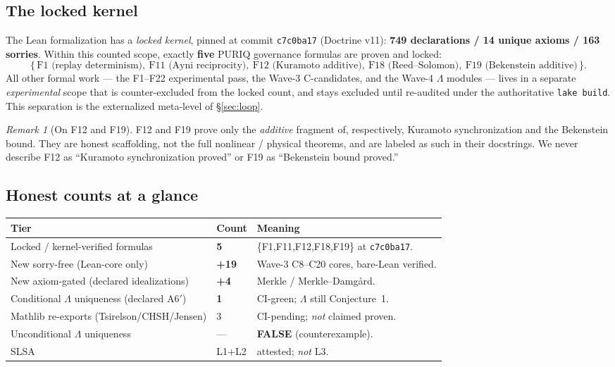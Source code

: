 \documentclass[11pt]{article}
\theoremstyle{plain}
\theoremstyle{definition}
\theoremstyle{remark}
\newtheorem{remark}[theorem]{Remark}
\newcommand{\La}{\Lambda}
\begin{document}
\subsection{The locked kernel}
\label{sec:locked}
The Lean formalization has a \emph{locked kernel}, pinned at commit
\texttt{c7c0ba17} (Doctrine v11): \textbf{749 declarations / 14 unique axioms / 163
sorries}. Within this counted scope, exactly \textbf{five} PURIQ governance
formulas are proven and locked:
\[
  \{\,\text{F1 (replay determinism)},\ \text{F11 (Ayni reciprocity)},\
    \text{F12 (Kuramoto additive)},\ \text{F18 (Reed--Solomon)},\
    \text{F19 (Bekenstein additive)}\,\}.
\]
All other formal work --- the F1--F22 experimental pass, the Wave-3 C-candidates,
and the Wave-4 $\La$ modules --- lives in a separate \emph{experimental} scope that
is counter-excluded from the locked count, and stays excluded until re-audited under
the authoritative \texttt{lake build}. This separation is the externalized
meta-level of \S\ref{sec:loop}.

\begin{remark}[On F12 and F19]
F12 and F19 prove only the \emph{additive} fragment of, respectively, Kuramoto
synchronization and the Bekenstein bound. They are honest scaffolding, not the full
nonlinear / physical theorems, and are labeled as such in their docstrings. We never
describe F12 as ``Kuramoto synchronization proved'' or F19 as ``Bekenstein bound
proved.''
\end{remark}

\subsection{Honest counts at a glance}
\begin{longtable}{@{}p{}p{}p{}@{}}
\toprule
\textbf{Tier} & \textbf{Count} & \textbf{Meaning} \\
\midrule
\endhead
Locked / kernel-verified formulas & \textbf{5} & \{F1,F11,F12,F18,F19\} at \texttt{c7c0ba17}. \\
New sorry-free (Lean-core only) & \textbf{+19} & Wave-3 C8--C20 cores, bare-Lean verified. \\
New axiom-gated (declared idealizations) & \textbf{+4} & Merkle / Merkle--Damg{\aa}rd. \\
Conditional $\La$ uniqueness (declared A6$'$) & \textbf{1} & CI-green; $\La$ still Conjecture~1. \\
Mathlib re-exports (Tsirelson/CHSH/Jensen) & 3 & CI-pending; \emph{not} claimed proven. \\
Unconditional $\La$ uniqueness & --- & \textbf{FALSE} (counterexample). \\
SLSA & L1+L2 & attested; \emph{not} L3. \\
\bottomrule
\end{longtable}
\end{document}
